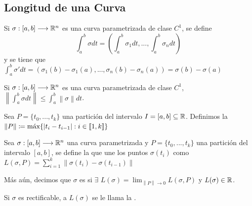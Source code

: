 \subsection{Longitud de una Curva}

\begin{dfn}

	Si $\sigma: [a,b] \longrightarrow \mathbb{R}^n$ es una curva parametrizada de clase $C^1$, se define
	 \[ \int_a ^b \sigma dt= \left( \int_a ^b \sigma_1 dt, ..., \int_a ^b \sigma_n dt   \right)  \]
	y se tiene que $\displaystyle \int_a ^b \sigma' dt= \left( \sigma_1(b)- \sigma_1(a), ..., \sigma_n(b)- \sigma_n(a)   \right) = \sigma(b)- \sigma(a) $

\end{dfn}


\begin{obs}

	Si $\sigma: [a,b] \longrightarrow \mathbb{R}^n$ es una curva parametrizada de clase $C^1$, $\displaystyle \left\| \int_a ^b \sigma dt \right\| \le \int_a ^b \left \| \sigma \right \| dt $.

\end{obs}

\begin{dfn}

	Sea $P= \{ t_0, ..., t_k  \}$ una partición del intervalo $I=[a,b] \subseteq \mathbb{R}$. Definimos la  $\displaystyle \left\| P \right\| \coloneqq \text{máx} \{ |t_i-t_{i-1}| : i \in [\![1,k]\!]  \}$ 

\end{dfn}


\begin{dfn}

	Sea $\sigma: [a,b] \longrightarrow \mathbb{R}^n$ una curva parametrizada y $P= \{ t_0, ..., t_k  \}$ una partición del intervalo $[a,b]$, se define la  que une los puntos $\sigma (t_i)$ como $\displaystyle L( \sigma ,P)= \sum _{i=1}^k \left\| \sigma (t_i)- \sigma (t_{i-1}) \right\|$


	Más aún, decimos que $\sigma$ es  si $\displaystyle  \exists \, \, L( \sigma )= \lim_{\left \| P \right\| \to 0} L( \sigma ,P)  $ y $L( \sigma ) \in \mathbb{R}$. 

	Si $\sigma$ es rectificable, a $L( \sigma )$ se le llama la .

\end{dfn}




